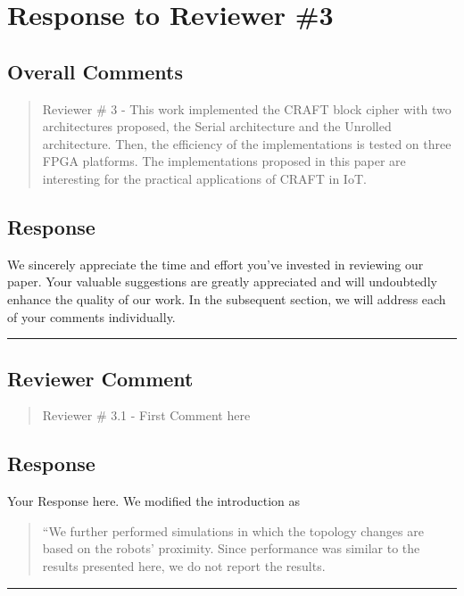 \section{Response to Reviewer \#3}
\subsection*{Overall Comments}
\begin{mdframed}
\begin{quote}
	 Reviewer \# 3 - This work implemented the CRAFT block cipher with two architectures proposed, the Serial architecture and the Unrolled architecture. Then, the efficiency of the implementations is tested on three FPGA platforms. The implementations proposed in this paper are interesting for the practical applications of CRAFT in IoT.
\end{quote}
\end{mdframed}

\subsection{Response} 

We sincerely appreciate the time and effort you've invested in reviewing our paper. Your valuable suggestions are greatly appreciated and will undoubtedly enhance the quality of our work. In the subsequent section, we will address each of your comments individually.

\noindent\rule{\linewidth}{2.0pt}

\subsection{Reviewer Comment}
\begin{mdframed}
\begin{quote}
	Reviewer \# 3.1 - First Comment here
\end{quote}
\end{mdframed}

\subsection{Response} 
Your Response here. We modified the introduction as

\begin{quote}
	``We further performed simulations in which the topology changes are based on the robots' proximity. Since performance was similar to the results presented here, we do not report the results.
\end{quote}

\noindent\rule{\linewidth}{6.0pt}
